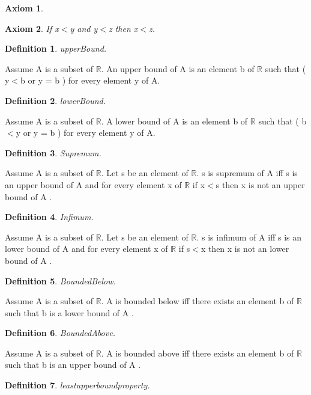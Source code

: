 \documentclass{article}
\newenvironment{forthel}{\begin{leftbar}}{\end{leftbar}}
\newtheorem{axiom}{Axiom}
\newtheorem{definition}{Definition}
\begin{document}
\begin{forthel}
\begin{axiom}
\end{axiom}
\begin{axiom} If x$<$y and y$<$z then x$<$z.

\end{axiom}



\begin{definition} upperBound.

\end{definition}
Assume A is a subset of $\mathbb{R}$.
An upper bound of A is an element b of $\mathbb{R}$ such that ( y$<$b or y = b ) for every element y of A.

\begin{definition} lowerBound.

\end{definition}
Assume A is a subset of $\mathbb{R}$.
A lower bound of A is an element b of $\mathbb{R}$ such that ( b$<$y or y = b ) for every element y of A.

\begin{definition} Supremum.

\end{definition}
Assume A is a subset of $\mathbb{R}$.
Let s be an element of $\mathbb{R}$.
s is supremum of A  iff s is an upper bound of A 
and for every element x of $\mathbb{R}$ if x$<$s then x is not an upper bound of A .

\begin{definition} Infimum.

\end{definition}
Assume A is a subset of $\mathbb{R}$.
Let s be an element of $\mathbb{R}$.
s is infimum of A  iff s is an lower bound of A 
and for every element x of $\mathbb{R}$ if s$<$x then x is not an lower bound of A .

\begin{definition} BoundedBelow.

\end{definition}
Assume A is a subset of $\mathbb{R}$.
A is bounded below  iff 
there exists an element b of $\mathbb{R}$ such that b is a lower bound of A .

\begin{definition} BoundedAbove.

\end{definition}
Assume A is a subset of $\mathbb{R}$.
A is bounded above  iff 
there exists an element b of $\mathbb{R}$ such that b is an upper bound of A .

\begin{definition} leastupperboundproperty.


\end{definition}
\end{forthel}
\end{document}

